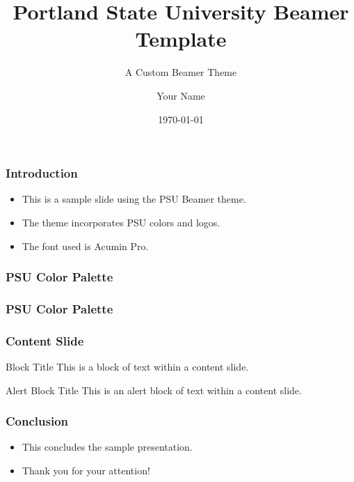 \documentclass{beamer}
\title{Portland State University Beamer Template}
\subtitle{A Custom Beamer Theme}
\author{Your Name}
\institute{Portland State University}
\date{\today}
\begin{document}
    {
    \begin{frame}
		\titlepage
	\end{frame}
    }

	\begin{frame}
		\frametitle{Introduction}
		\begin{itemize}
			\item This is a sample slide using the PSU Beamer theme.

			\item The theme incorporates PSU colors and logos.

			\item The font used is Acumin Pro.
		\end{itemize}
	\end{frame}

	\begin{frame}
		\frametitle{PSU Color Palette}
		\showPSUColorsPrimary
	\end{frame}

	\begin{frame}
		\frametitle{PSU Color Palette}
		\showPSUColorsSecondary
	\end{frame}

	\begin{frame}
		\frametitle{Content Slide}
		\begin{block}{Block Title}
			This is a block of text within a content slide.
		\end{block}
        \begin{alertblock}{Alert Block Title}
            This is an alert block of text within a content slide.
        \end{alertblock}
	\end{frame}

	\begin{frame}
		\frametitle{Conclusion}
		\begin{itemize}
			\item This concludes the sample presentation.

			\item Thank you for your attention!
		\end{itemize}
	\end{frame}
\end{document}
